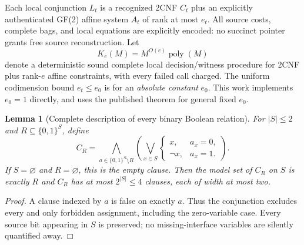 \documentclass[11pt]{article}
\newtheorem{lemma}[theorem]{Lemma}
\begin{document}
Each local conjunction $L_t$ is a recognized 2CNF $C_t$ plus an explicitly
authenticated GF(2) affine system $A_t$ of rank at most $e_t$. All source
costs, complete bags, and local equations are explicitly encoded: no
succinct pointer grants free source reconstruction. Let
\[ K_e(M)=M^{O(e)}\operatorname{poly}(M) \]
denote a deterministic sound complete local decision/witness procedure for
2CNF plus rank-$e$ affine constraints, with every failed call charged. The
uniform codimension bound $e_t\le e_0$ is for an \emph{absolute constant}
$e_0$. This work implements $e_0=1$ directly, and uses the published theorem
for general fixed $e_0$.

\begin{lemma}[Complete description of every binary Boolean relation]
\label{lem:binary}
For $|S|\le2$ and $R\subseteq\{0,1\}^{S}$, define
\[
 C_R=\bigwedge_{a\in\{0,1\}^S\setminus R}
       \left(\bigvee_{x\in S} \begin{cases}x,&a_x=0,\\\neg x,&a_x=1.\end{cases}\right).
\]
If $S=\varnothing$ and $R=\varnothing$, this is the empty clause.
Then the model set of $C_R$ on $S$ is exactly $R$ and $C_R$ has at most
$2^{|S|}\le4$ clauses, each of width at most two.
\end{lemma}
\begin{proof}
A clause indexed by $a$ is false on exactly $a$. Thus the conjunction
excludes every and only forbidden assignment, including the zero-variable
case. Every source bit appearing in $S$ is preserved; no missing-interface
variables are silently quantified away.
\end{proof}
\end{document}
